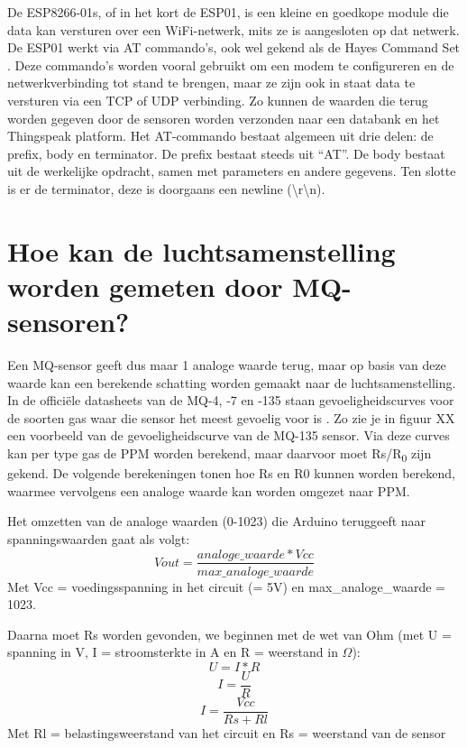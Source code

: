 De ESP8266-01s, of in het kort de ESP01, is een kleine en goedkope module die data kan versturen over een WiFi-netwerk, mits ze is aangesloten op dat netwerk. De ESP01 werkt via AT commando's, ook wel gekend als de Hayes Command Set 
. Deze commando's worden vooral gebruikt om een ​​modem te configureren en de netwerkverbinding tot stand te brengen, maar ze zijn ook in staat data te versturen via een TCP of UDP verbinding. Zo kunnen de waarden die terug worden gegeven door de sensoren worden verzonden naar een databank en het Thingspeak platform.
Het AT-commando bestaat algemeen uit drie delen: de prefix, body en terminator. De prefix bestaat steeds uit ``AT''. De body bestaat uit de werkelijke opdracht, samen met parameters en andere gegevens. Ten slotte is er de terminator, deze is doorgaans een newline (\textbackslash r\textbackslash n).



\section{Hoe kan de luchtsamenstelling worden gemeten door MQ-sensoren?}%
\label{sec:hoe-luchtsamenstelling meten}

Een MQ-sensor geeft dus maar 1 analoge waarde terug, maar op basis van deze waarde kan een berekende schatting worden gemaakt naar de luchtsamenstelling. In de officiële datasheets van de MQ-4, -7 en -135 staan gevoeligheidscurves voor de soorten gas waar die sensor het meest gevoelig voor is
. Zo zie je in figuur XX een voorbeeld van de gevoeligheidscurve van de MQ-135 sensor.
Via deze curves kan per type gas de PPM worden berekend, maar daarvoor moet Rs/R\textsubscript{0} zijn gekend. De volgende berekeningen tonen hoe Rs en R0 kunnen worden berekend, waarmee vervolgens een analoge waarde kan worden omgezet naar PPM.

Het omzetten van de analoge waarden (0-1023) die Arduino teruggeeft naar spanningswaarden gaat als volgt:
\begin{equation}
    Vout = \frac{analoge\_waarde * Vcc}{max\_analoge\_waarde}
\end{equation}
Met Vcc = voedingsspanning in het circuit (= 5V) en max\_analoge\_waarde = 1023.

Daarna moet Rs worden gevonden, we beginnen met de wet van Ohm (met U = spanning in V, I = stroomsterkte in A en R = weerstand in $\Omega$):
\begin{equation}
    U = I * R
\end{equation}
\begin{equation}
    I = \frac{U}{R}
\end{equation}
\begin{equation}
    I = \frac{Vcc}{Rs+Rl}
\end{equation}
Met Rl = belastingsweerstand van het circuit en Rs = weerstand van de sensor

